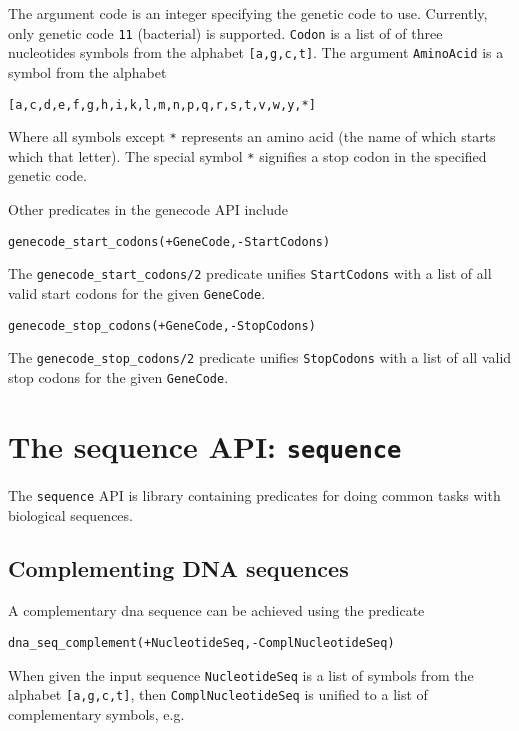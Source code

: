 \documentclass{book}
\begin{document}
\noindent
The argument code is an integer specifying the genetic code to
use. Currently, only genetic code \texttt{11} (bacterial) is
supported. \texttt{Codon} is a list of of three nucleotides symbols
from the alphabet \texttt{[a,g,c,t]}. The argument \texttt{AminoAcid}
is a symbol from the alphabet
\begin{verbatim}
[a,c,d,e,f,g,h,i,k,l,m,n,p,q,r,s,t,v,w,y,*]
\end{verbatim}

\noindent
Where all symbols except \texttt{*} represents an amino acid (the name
of which starts which that letter). The special symbol \texttt{*}
signifies a stop codon in the specified genetic code.

Other predicates in the genecode API include
\begin{verbatim}
genecode_start_codons(+GeneCode,-StartCodons)
\end{verbatim}

\noindent
The \texttt{genecode\_start\_codons/2} predicate unifies \texttt{StartCodons} with a list of all valid
start codons for the given \texttt{GeneCode}.

\begin{verbatim}
genecode_stop_codons(+GeneCode,-StopCodons)
\end{verbatim}

\noindent
The \texttt{genecode\_stop\_codons/2} predicate unifies \texttt{StopCodons} with a list of all valid
stop codons for the given \texttt{GeneCode}.

\section{The sequence API: \texttt{sequence}}

The \texttt{sequence} API is library containing predicates for 
doing common tasks with biological sequences.

\subsection{Complementing DNA sequences}

A complementary dna sequence can be achieved using the predicate

\begin{verbatim}
dna_seq_complement(+NucleotideSeq,-ComplNucleotideSeq)
\end{verbatim}

\noindent
When given the input sequence \texttt{NucleotideSeq} is a list of symbols from the alphabet
\texttt{[a,g,c,t]}, then \texttt{ComplNucleotideSeq} is unified to a list of complementary
symbols, e.g.
\end{document}
